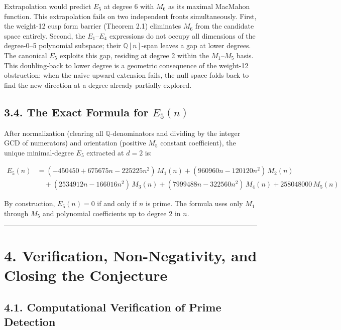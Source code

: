 \documentclass[
  11pt,
]{article}
\begin{document}
Extrapolation would predict \(E_5\) at degree 6 with \(M_6\) as its
maximal MacMahon function. This extrapolation fails on two independent
fronts simultaneously. First, the weight-12 cusp form barrier (Theorem
2.1) eliminates \(M_6\) from the candidate space entirely. Second, the
\(E_1\)--\(E_4\) expressions do not occupy all dimensions of the
degree-0--5 polynomial subspace; their \(\mathbb{Q}[n]\)-span leaves a
gap at lower degrees. The canonical \(E_5\) exploits this gap, residing
at degree 2 within the \(M_1\)--\(M_5\) basis. This doubling-back to
lower degree is a geometric consequence of the weight-12 obstruction:
when the naive upward extension fails, the null space folds back to find
the new direction at a degree already partially explored.

\subsection{\texorpdfstring{3.4. The Exact Formula for
\(E_5(n)\)}{3.4. The Exact Formula for E\_5(n)}}\label{the-exact-formula-for-e_5n}

After normalization (clearing all \(\mathbb{Q}\)-denominators and
dividing by the integer GCD of numerators) and orientation (positive
\(M_5\) constant coefficient), the unique minimal-degree \(E_5\)
extracted at \(d=2\) is:

\[\boxed{\begin{aligned}
E_5(n) &= (-450450 + 675675n - 225225n^2)\,M_1(n) + (960960n - 120120n^2)\,M_2(n) \\
       &\quad + (2534912n - 166016n^2)\,M_3(n) + (7999488n - 322560n^2)\,M_4(n) + 258048000\,M_5(n)
\end{aligned}}\]

By construction, \(E_5(n) = 0\) if and only if \(n\) is prime. The
formula uses only \(M_1\) through \(M_5\) and polynomial coefficients up
to degree 2 in \(n\).

\begin{center}\rule{0.5\linewidth}{0.5pt}\end{center}

\section{4. Verification, Non-Negativity, and Closing the
Conjecture}\label{verification-non-negativity-and-closing-the-conjecture}

\subsection{4.1. Computational Verification of Prime
Detection}\label{computational-verification-of-prime-detection}
\end{document}
